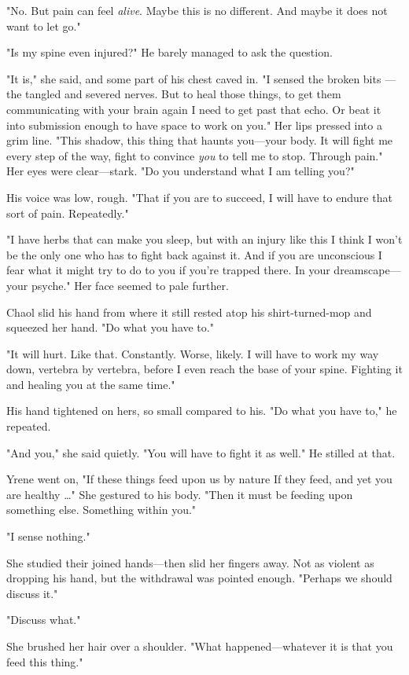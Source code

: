 "No. But pain can feel \emph{alive}. Maybe this is no different. And maybe it does not want to let go."

"Is my spine even injured?" He barely managed to ask the question.

"It is," she said, and some part of his chest caved in. "I sensed the broken bits ---the tangled and severed nerves. But to heal those things, to get them communicating with your brain again  I need to get past that echo. Or beat it into submission enough to have space to work on you." Her lips pressed into a grim line. "This shadow, this thing that haunts you---your body. It will fight me every step of the way, fight to convince \emph{you} to tell me to stop. Through pain." Her eyes were clear---stark. "Do you understand what I am telling you?"

His voice was low, rough. "That if you are to succeed, I will have to endure that sort of pain. Repeatedly."

"I have herbs that can make you sleep, but with an injury like this
 I think I won't be the only one who has to fight back against it. And if you are unconscious  I fear what it might try to do to you if you're trapped there. In your dreamscape---your psyche." Her face seemed to pale further.

Chaol slid his hand from where it still rested atop his shirt-turned-mop and squeezed her hand. "Do what you have to."

"It will hurt. Like that. Constantly. Worse, likely. I will have to work my way down, vertebra by vertebra, before I even reach the base of your spine. Fighting it and healing you at the same time."

His hand tightened on hers, so small compared to his. "Do what you have to," he repeated.

"And you," she said quietly. "You will have to fight it as well." He stilled at that.

Yrene went on, "If these things feed upon us by nature  If they feed, and yet you are healthy \ldots" She gestured to his body. "Then it must be feeding upon something else. Something within you."

"I sense nothing."

She studied their joined hands---then slid her fingers away. Not as violent as dropping his hand, but the withdrawal was pointed enough. "Perhaps we should discuss it."

"Discuss what."

She brushed her hair over a shoulder. "What happened---whatever it is that you feed this thing."

